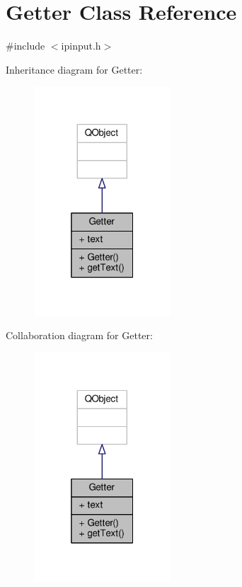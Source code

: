 \hypertarget{classGetter}{}\section{Getter Class Reference}
\label{classGetter}


{\ttfamily \#include $<$ipinput.\+h$>$}



Inheritance diagram for Getter\+:
\nopagebreak
\begin{figure}[H]
\begin{center}
\leavevmode
\includegraphics[width=145pt]{classGetter__inherit__graph}
\end{center}
\end{figure}


Collaboration diagram for Getter\+:
\nopagebreak
\begin{figure}[H]
\begin{center}
\leavevmode
\includegraphics[width=145pt]{classGetter__coll__graph}
\end{center}
\end{figure}

